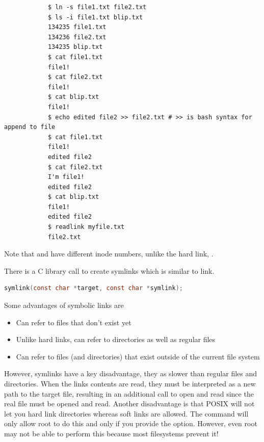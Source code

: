 \begin{enumerate}
        \begin{verbatim}
            $ ln -s file1.txt file2.txt
            $ ls -i file1.txt blip.txt
            134235 file1.txt
            134236 file2.txt
            134235 blip.txt
            $ cat file1.txt
            file1!
            $ cat file2.txt
            file1!
            $ cat blip.txt
            file1!
            $ echo edited file2 >> file2.txt # >> is bash syntax for append to file
            $ cat file1.txt
            file1!
            edited file2
            $ cat file2.txt
            I'm file1!
            edited file2
            $ cat blip.txt
            file1!
            edited file2
            $ readlink myfile.txt
            file2.txt
        \end{verbatim}

        Note that  and  have different inode numbers, unlike the hard link, .

        There is a C library call to create symlinks which is similar to link.

        \begin{lstlisting}[language=C]
        symlink(const char *target, const char *symlink);
        \end{lstlisting}

        Some advantages of symbolic links are

        \begin{itemize}
            \tightlist
                \item Can refer to files that don't exist yet
                \item Unlike hard links, can refer to directories as well as regular files
                \item Can refer to files (and directories) that exist outside of the current file system
        \end{itemize}

        However, symlinks have a key disadvantage, they as slower than regular files and directories.
        When the links contents are read, they must be interpreted as a new path to the target file, resulting in an additional call to open and read since the real file must be opened and read.
        Another disadvantage is that POSIX will not let you hard link directories whereas soft links are allowed.
        The  command will only allow root to do this and only if you provide the  option.
        However, even root may not be able to perform this because most filesystems prevent it!
\end{enumerate}

